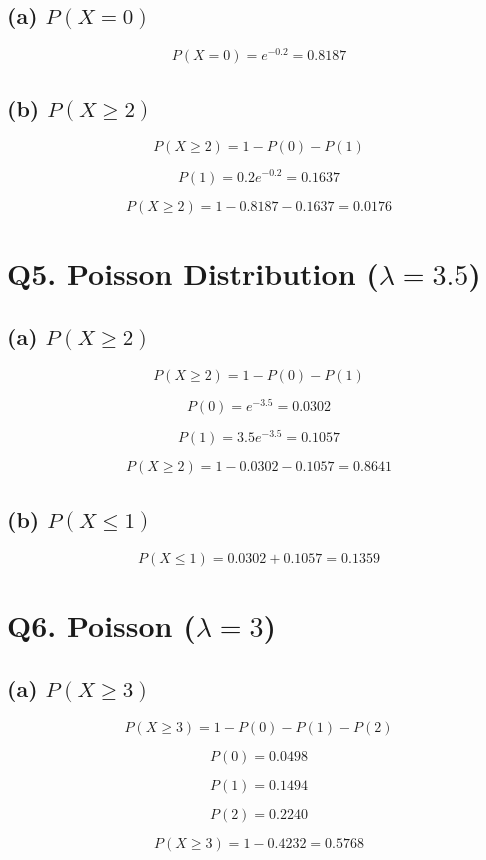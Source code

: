 \documentclass[12pt]{article}
\begin{document}
\subsection*{(a) $P(X=0)$}

\[
P(X=0)=e^{-0.2}=0.8187
\]

\subsection*{(b) $P(X\ge2)$}

\[
P(X\ge2)=1-P(0)-P(1)
\]

\[
P(1)=0.2e^{-0.2}=0.1637
\]

\[
P(X\ge2)=1-0.8187-0.1637=0.0176
\]

\section*{Q5. Poisson Distribution ($\lambda = 3.5$)}

\subsection*{(a) $P(X\ge2)$}

\[
P(X\ge2)=1-P(0)-P(1)
\]

\[
P(0)=e^{-3.5}=0.0302
\]

\[
P(1)=3.5e^{-3.5}=0.1057
\]

\[
P(X\ge2)=1-0.0302-0.1057=0.8641
\]

\subsection*{(b) $P(X\le1)$}

\[
P(X\le1)=0.0302+0.1057=0.1359
\]

\section*{Q6. Poisson ($\lambda = 3$)}

\subsection*{(a) $P(X\ge3)$}

\[
P(X\ge3)=1-P(0)-P(1)-P(2)
\]

\[
P(0)=0.0498
\]

\[
P(1)=0.1494
\]

\[
P(2)=0.2240
\]

\[
P(X\ge3)=1-0.4232=0.5768
\]
\end{document}
